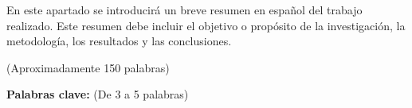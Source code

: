 
En este apartado se introducirá un breve resumen en español del trabajo realizado. Este resumen debe incluir el objetivo o propósito de la investigación, la metodología, los resultados y las conclusiones.

(Aproximadamente 150 palabras)

\textbf{Palabras clave:} (De 3 a 5 palabras)